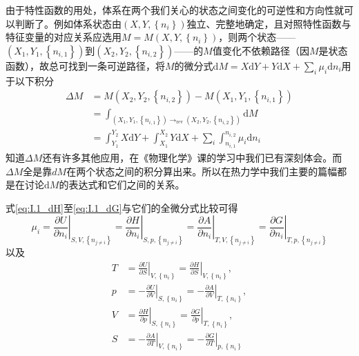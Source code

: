 \documentclass[main.tex]{subfiles}
\begin{document}
由于特性函数的用处，体系在两个我们关心的状态之间变化的可逆性和方向性就可以判断了。例如体系状态由$\left(X,Y,\left\{n_i\right\}\right)$独立、完整地确定，且对照特性函数与特征变量的对应关系应选用$M=M\left(X,Y,\left\{n_i\right\}\right)$，则两个状态——$\left(X_1,Y_1,\left\{n_{i,1}\right\}\right)$到$\left(X_2,Y_2,\left\{n_{i,2}\right\}\right)$——的$M$值变化不依赖路径（因$M$是状态函数），故总可找到一条可逆路径，将$M$的微分式$\mathrm{d}M=X\mathrm{d}Y+Y\mathrm{d}X+\sum_i\mu_i\mathrm{d}n_i$用于以下积分
\begin{align}\label{eq:I.1_integral_of_function}
    \Delta M & =M\left(X_2,Y_2,\left\{n_{i,2}\right\}\right)-M\left(X_1,Y_1,\left\{n_{i,1}\right\}\right)                                      \\
             & =\int_{\left(X_1,Y_1,\left\{n_{i,1}\right\}\right)\rightarrow_\text{rev}\left(X_2,Y_2,\left\{n_{i,2}\right\}\right)}\mathrm{d}M \\
             & =\int_{Y_1}^{Y_2}X\mathrm{d}Y+\int_{X_1}^{X_2}Y\mathrm{d}X+\sum_i\int_{n_{i,1}}^{n_{i,2}}\mu_i\mathrm{d}n_i
\end{align}
知道$\Delta M$还有许多其他应用，在《物理化学》课的学习中我们已有深刻体会。而$\Delta M$全是靠$dM$在两个状态之间的积分算出来。所以在热力学中我们主要的篇幅都是在讨论$\mathrm{d}M$的表达式和它们之间的关系。

式\eqref{eq:I.1_dH}至\eqref{eq:I.1_dG}与它们的全微分式比较可得
\begin{equation}
    \mu_i=\left.\frac{\partial U}{\partial n_i}\right|_{S,V,\left\{n_{j\neq i}\right\}}
    =\left.\frac{\partial H}{\partial n_i}\right|_{S,p,\left\{n_{j\neq i}\right\}}
    =\left.\frac{\partial A}{\partial n_i}\right|_{T,V,\left\{n_{j\neq i}\right\}}
    =\left.\frac{\partial G}{\partial n_i}\right|_{T,p,\left\{n_{j\neq i}\right\}}\label{eq:I.1_first_order_partial_mu}
\end{equation}
以及
\begin{align}
    T & =\left.\frac{\partial U}{\partial S}\right|_{V,\left\{n_i\right\}}=\left.\frac{\partial H}{\partial S}\right|_{V,\left\{n_i\right\}},\label{eq:I.1_first_order_partial_T}   \\
    p & =-\left.\frac{\partial U}{\partial V}\right|_{S,\left\{n_i\right\}}=-\left.\frac{\partial A}{\partial V}\right|_{T,\left\{n_i\right\}},\label{eq:I.1_first_order_partial_p} \\
    V & =\left.\frac{\partial H}{\partial p}\right|_{S,\left\{n_i\right\}}=\left.\frac{\partial G}{\partial p}\right|_{T,\left\{n_i\right\}},\label{eq:I.1_first_order_partial_V}   \\
    S & =-\left.\frac{\partial A}{\partial T}\right|_{V,\left\{n_i\right\}}=-\left.\frac{\partial G}{\partial T}\right|_{p,\left\{n_i\right\}}\label{eq:I.1_first_order_partial_S}
\end{align}
\end{document}

